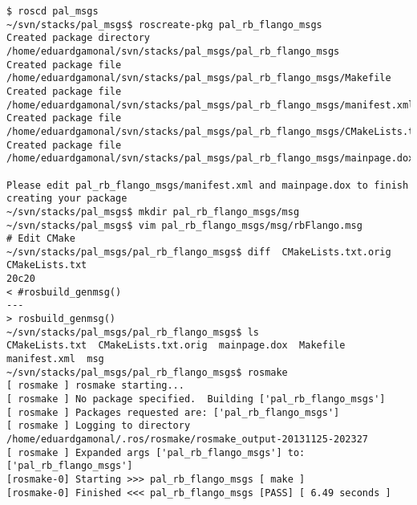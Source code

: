 \begin{lstlisting}[caption=Flango files layout, label=impl-ros-create-message]
$ roscd pal_msgs
~/svn/stacks/pal_msgs$ roscreate-pkg pal_rb_flango_msgs
Created package directory /home/eduardgamonal/svn/stacks/pal_msgs/pal_rb_flango_msgs
Created package file /home/eduardgamonal/svn/stacks/pal_msgs/pal_rb_flango_msgs/Makefile
Created package file /home/eduardgamonal/svn/stacks/pal_msgs/pal_rb_flango_msgs/manifest.xml
Created package file /home/eduardgamonal/svn/stacks/pal_msgs/pal_rb_flango_msgs/CMakeLists.txt
Created package file /home/eduardgamonal/svn/stacks/pal_msgs/pal_rb_flango_msgs/mainpage.dox

Please edit pal_rb_flango_msgs/manifest.xml and mainpage.dox to finish creating your package
~/svn/stacks/pal_msgs$ mkdir pal_rb_flango_msgs/msg
~/svn/stacks/pal_msgs$ vim pal_rb_flango_msgs/msg/rbFlango.msg
# Edit CMake
~/svn/stacks/pal_msgs/pal_rb_flango_msgs$ diff  CMakeLists.txt.orig CMakeLists.txt
20c20
< #rosbuild_genmsg()
---
> rosbuild_genmsg()
~/svn/stacks/pal_msgs/pal_rb_flango_msgs$ ls
CMakeLists.txt  CMakeLists.txt.orig  mainpage.dox  Makefile  manifest.xml  msg
~/svn/stacks/pal_msgs/pal_rb_flango_msgs$ rosmake
[ rosmake ] rosmake starting...                                                                                                                                                                                     
[ rosmake ] No package specified.  Building ['pal_rb_flango_msgs']                                                                                                                                                  
[ rosmake ] Packages requested are: ['pal_rb_flango_msgs']                                                                                                                                                          
[ rosmake ] Logging to directory /home/eduardgamonal/.ros/rosmake/rosmake_output-20131125-202327                                                                                                                    
[ rosmake ] Expanded args ['pal_rb_flango_msgs'] to:
['pal_rb_flango_msgs']                                                                                                                                         
[rosmake-0] Starting >>> pal_rb_flango_msgs [ make ]                                                                                                                                                                
[rosmake-0] Finished <<< pal_rb_flango_msgs [PASS] [ 6.49 seconds ]                                                                                                                                                 

\end{lstlisting}
